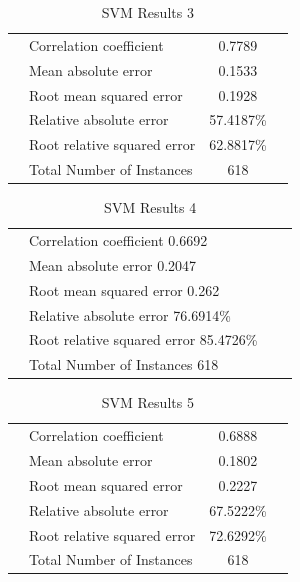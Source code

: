 \begin{table}[ht]
\begin{center}
\begin{tabular}{ ll c r }
\hline
 & Correlation coefficient  &                0.7789 \\
 & Mean absolute error       &               0.1533 \\
 & Root mean squared error   &               0.1928 \\
 & Relative absolute error   &              57.4187\% \\
 & Root relative squared error  &           62.8817\% \\
 & Total Number of Instances     &         618  \\
\hline
\end{tabular}
\label{tab:svm3}
\caption{SVM Results 3}
\end{center}
\end{table}

\begin{table}[ht]
\begin{center}
\begin{tabular}{ ll c r }
\hline
 & Correlation coefficient                  0.6692 \\
 & Mean absolute error                      0.2047 \\
 & Root mean squared error                  0.262 \\
 & Relative absolute error                 76.6914\% \\
 & Root relative squared error             85.4726\% \\
 & Total Number of Instances              618  \\
\hline
\end{tabular}
\label{tab:svm4}
\caption{SVM Results 4}
\end{center}
\end{table}


\begin{table}[ht]
\begin{center}
\begin{tabular}{ ll c r }
\hline
 & Correlation coefficient   &              0.6888 \\
 & Mean absolute error        &              0.1802 \\
 & Root mean squared error    &              0.2227 \\
 & Relative absolute error    &             67.5222\% \\
 & Root relative squared error &             72.6292\% \\
 & Total Number of Instances   &           618     \\
\hline
\end{tabular}
\label{tab:svm5}
\caption{SVM Results 5}
\end{center}
\end{table}

